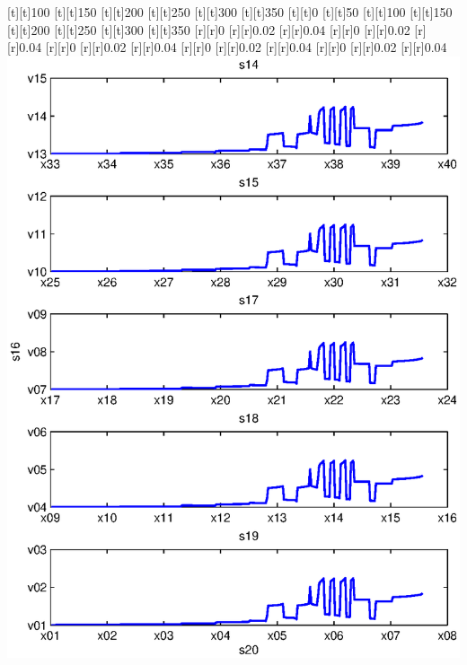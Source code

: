 \begin{psfrags}
[t][t]{100}%
[t][t]{150}%
[t][t]{200}%
[t][t]{250}%
[t][t]{300}%
[t][t]{350}%
[t][t]{0}%
[t][t]{50}%
[t][t]{100}%
[t][t]{150}%
[t][t]{200}%
[t][t]{250}%
[t][t]{300}%
[t][t]{350}%
%
[r][r]{0}%
[r][r]{0.02}%
[r][r]{0.04}%
[r][r]{0}%
[r][r]{0.02}%
[r][r]{0.04}%
[r][r]{0}%
[r][r]{0.02}%
[r][r]{0.04}%
[r][r]{0}%
[r][r]{0.02}%
[r][r]{0.04}%
[r][r]{0}%
[r][r]{0.02}%
[r][r]{0.04}%
%
\includegraphics[width=15cm]{rmse_300_64.eps}%
\end{psfrags}%
%
